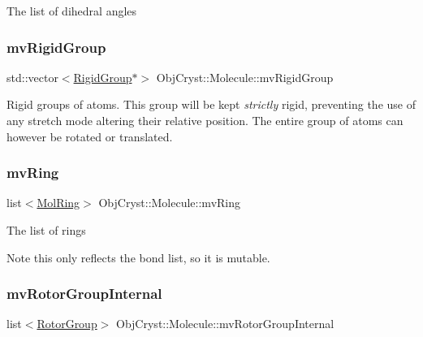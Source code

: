 The list of dihedral angles \mbox{\label{class_obj_cryst_1_1_molecule_a43939b3e3ad83065cf7ccb6065a53a12}} 
\subsubsection{\texorpdfstring{mvRigidGroup}{mvRigidGroup}}
{\footnotesize\ttfamily std\+::vector$<$\mbox{\hyperlink{class_obj_cryst_1_1_rigid_group}{Rigid\+Group}}$\ast$$>$ Obj\+Cryst\+::\+Molecule\+::mv\+Rigid\+Group}

Rigid groups of atoms. This group will be kept {\itshape strictly} rigid, preventing the use of any stretch mode altering their relative position. The entire group of atoms can however be rotated or translated. \mbox{\label{class_obj_cryst_1_1_molecule_a35cb61305129b6bbda4a0bb014b2c90e}} 
\subsubsection{\texorpdfstring{mvRing}{mvRing}}
{\footnotesize\ttfamily list$<$\mbox{\hyperlink{class_obj_cryst_1_1_mol_ring}{Mol\+Ring}}$>$ Obj\+Cryst\+::\+Molecule\+::mv\+Ring\hspace{0.3cm}{\ttfamily [mutable]}}

The list of rings

\begin{DoxyNote}{Note}
this only reflects the bond list, so it is mutable. 
\end{DoxyNote}
\mbox{\label{class_obj_cryst_1_1_molecule_ac54d8a074549f7710a1823b0ecefcde8}} 
\subsubsection{\texorpdfstring{mvRotorGroupInternal}{mvRotorGroupInternal}}
{\footnotesize\ttfamily list$<$\mbox{\hyperlink{struct_obj_cryst_1_1_molecule_1_1_rotor_group}{Rotor\+Group}}$>$ Obj\+Cryst\+::\+Molecule\+::mv\+Rotor\+Group\+Internal\hspace{0.3cm}{\ttfamily [mutable]}}

